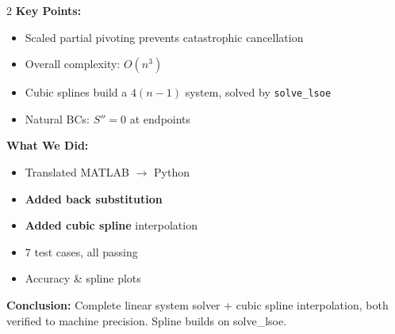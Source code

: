 \documentclass[a4paper,landscape,12pt]{extarticle}
\begin{document}
\begin{huge}
\begin{multicols}{2}
\textbf{Key Points:}
\begin{itemize}
  \item Scaled partial pivoting prevents catastrophic cancellation
  \item Overall complexity: $O(n^3)$
  \item Cubic splines build a $4(n{-}1)$ system, solved by \texttt{solve\_lsoe}
  \item Natural BCs: $S'' = 0$ at endpoints
\end{itemize}

\columnbreak

\textbf{What We Did:}
\begin{itemize}
  \item Translated MATLAB $\to$ Python
  \item \textbf{Added back substitution}
  \item \textbf{Added cubic spline} interpolation
  \item 7 test cases, all passing
  \item Accuracy \& spline plots
\end{itemize}
\end{multicols}

\vspace{0.2in}
\begin{center}
\textbf{Conclusion:} Complete linear system solver + cubic spline interpolation,
both verified to machine precision. Spline builds on solve\_lsoe.
\end{center}

\leftskip 0in \rightskip 0in

\end{huge}
\end{document}
